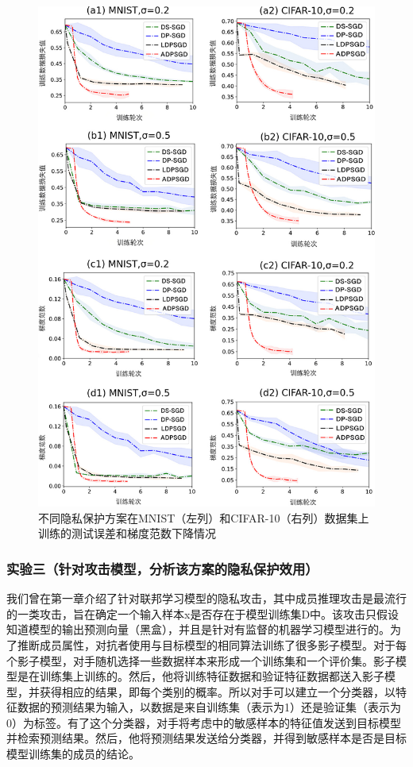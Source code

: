 \begin{figure}[!hbt]
\centering
	\includegraphics[scale=0.1]{fig2/C3/第三章实验二}%
	\caption{不同隐私保护方案在MNIST（左列）和CIFAR-10（右列）数据集上训练的测试误差和梯度范数下降情况}
	\label{fig:不同隐私保护方案在MNIST（左列）和CIFAR-10（右列）数据集上训练的测试误差和梯度范数下降情况}	
\end{figure}

\subsubsection{实验三（针对攻击模型，分析该方案的隐私保护效用）} 
我们曾在第一章介绍了针对联邦学习模型的隐私攻击，其中成员推理攻击是最流行的一类攻击，旨在确定一个输入样本x是否存在于模型训练集D中。该攻击只假设知道模型的输出预测向量（黑盒），并且是针对有监督的机器学习模型进行的。为了推断成员属性，对抗者使用与目标模型的相同算法训练了很多影子模型。对于每个影子模型，对手随机选择一些数据样本来形成一个训练集和一个评价集。影子模型是在训练集上训练的。然后，他将训练特征数据和验证特征数据都送入影子模型，并获得相应的结果，即每个类别的概率。所以对手可以建立一个分类器，以特征数据的预测结果为输入，以数据是来自训练集（表示为1）还是验证集（表示为0）为标签。有了这个分类器，对手将考虑中的敏感样本的特征值发送到目标模型并检索预测结果。然后，他将预测结果发送给分类器，并得到敏感样本是否是目标模型训练集的成员的结论。

